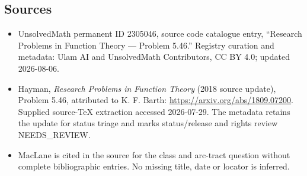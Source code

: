 \documentclass[11pt]{article}
\begin{document}
\subsection{Sources}
\begin{itemize}
\item UnsolvedMath permanent ID 2305046, source code catalogue entry, ``Research Problems in Function Theory --- Problem 5.46.'' Registry curation and metadata: Ulam AI and UnsolvedMath Contributors, CC BY 4.0; updated 2026-08-06.
\item Hayman, \emph{Research Problems in Function Theory} (2018 source update), Problem 5.46, attributed to K. F. Barth: \url{https://arxiv.org/abs/1809.07200}. Supplied source-TeX extraction accessed 2026-07-29. The metadata retains the update for status triage and marks status/release and rights review NEEDS\_REVIEW.
\item MacLane is cited in the source for the class and arc-tract question without complete bibliographic entries. No missing title, date or locator is inferred.
\end{itemize}
\end{document}

